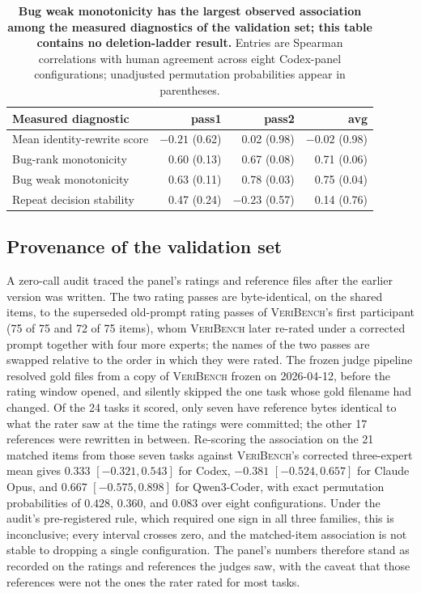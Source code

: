 \begin{table}[htbp]
\centering\small
\begin{tabular}{@{}lrrr@{}}
\toprule
Measured diagnostic & pass1 & pass2 & avg \\
\midrule
Mean identity-rewrite score & $-0.21$ (0.62) & 0.02 (0.98) & $-0.02$ (0.98) \\
Bug-rank monotonicity & 0.60 (0.13) & 0.67 (0.08) & 0.71 (0.06) \\
Bug weak monotonicity & 0.63 (0.11) & 0.78 (0.03) & 0.75 (0.04) \\
Repeat decision stability & 0.47 (0.24) & $-0.23$ (0.57) & 0.14 (0.76) \\
\bottomrule
\end{tabular}
\caption{\textbf{Bug weak monotonicity has the largest observed association among the measured diagnostics of the validation set; this table contains no deletion-ladder result.} Entries are Spearman correlations with human agreement across eight Codex-panel configurations; unadjusted permutation probabilities appear in parentheses.}
\label{tab:property_assoc}
\end{table}

\subsection{Provenance of the validation set}\label{app:provenance}
A zero-call audit traced the panel's ratings and reference files after the earlier version was written.
The two rating passes are byte-identical, on the shared items, to the superseded old-prompt rating passes of \textsc{VeriBench}'s first participant (75 of 75 and 72 of 75 items), whom \textsc{VeriBench} later re-rated under a corrected prompt together with four more experts; the names of the two passes are swapped relative to the order in which they were rated.
The frozen judge pipeline resolved gold files from a copy of \textsc{VeriBench} frozen on 2026-04-12, before the rating window opened, and silently skipped the one task whose gold filename had changed.
Of the 24 tasks it scored, only seven have reference bytes identical to what the rater saw at the time the ratings were committed; the other 17 references were rewritten in between.
Re-scoring the association on the 21 matched items from those seven tasks against \textsc{VeriBench}'s corrected three-expert mean gives $0.333$ $[-0.321, 0.543]$ for Codex, $-0.381$ $[-0.524, 0.657]$ for Claude Opus, and $0.667$ $[-0.575, 0.898]$ for Qwen3-Coder, with exact permutation probabilities of $0.428$, $0.360$, and $0.083$ over eight configurations.
Under the audit's pre-registered rule, which required one sign in all three families, this is inconclusive; every interval crosses zero, and the matched-item association is not stable to dropping a single configuration.
The panel's numbers therefore stand as recorded on the ratings and references the judges saw, with the caveat that those references were not the ones the rater rated for most tasks.

